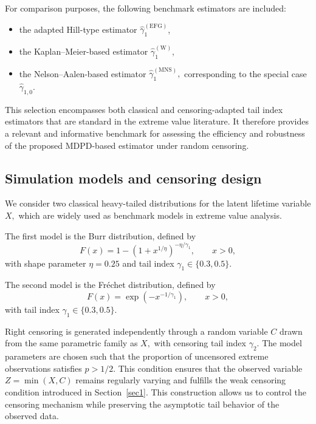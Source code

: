 \documentclass[reqno,openbib,runningheads,a4paper,12pt]{amsart}%
\begin{document}
\noindent For comparison purposes, the following benchmark estimators are included:

\begin{itemize}
\item the adapted Hill-type estimator $\widehat{\gamma}_{1}^{(\mathrm{EFG})}$,

\item the Kaplan--Meier-based estimator $\widehat{\gamma}_{1}^{(\mathrm{W})},$

\item the Nelson--Aalen-based estimator $\widehat{\gamma}_{1}^{(\mathrm{MNS}%
)},$ corresponding to the special case $\widehat{\gamma}_{1,0}.$
\end{itemize}

\noindent This selection encompasses both classical and censoring-adapted tail
index estimators that are standard in the extreme value literature. It
therefore provides a relevant and informative benchmark for assessing the
efficiency and robustness of the proposed MDPD-based estimator under random censoring.

\subsection{Simulation models and censoring design}

\noindent We consider two classical heavy-tailed distributions for the latent
lifetime variable $X,$ which are widely used as benchmark models in extreme
value analysis.\smallskip

\noindent The first model is the Burr distribution, defined by
\[
F(x)=1-\left(  1+x^{1/\eta}\right)  ^{-\eta/\gamma_{1}},\qquad x>0,
\]
with shape parameter $\eta=0.25$ and tail index $\gamma_{1}\in\{0.3,0.5\}.$%
\smallskip

\noindent The second model is the Fr\'{e}chet distribution, defined by
\[
F(x)=\exp\left(  -x^{-1/\gamma_{1}}\right)  ,\qquad x>0,
\]
with tail index $\gamma_{1}\in\{0.3,0.5\}.$\smallskip

\noindent Right censoring is generated independently through a random variable
$C$ drawn from the same parametric family as $X,$ with censoring tail index
$\gamma_{2}.$ The model parameters are chosen such that the proportion of
uncensored extreme observations satisfies $p>1/2.$ This condition ensures that
the observed variable $Z=\min(X,C)$ remains regularly varying and fulfills the
weak censoring condition introduced in Section~\ref{sec1}. This construction
allows us to control the censoring mechanism while preserving the asymptotic
tail behavior of the observed data.\smallskip
\end{document}
